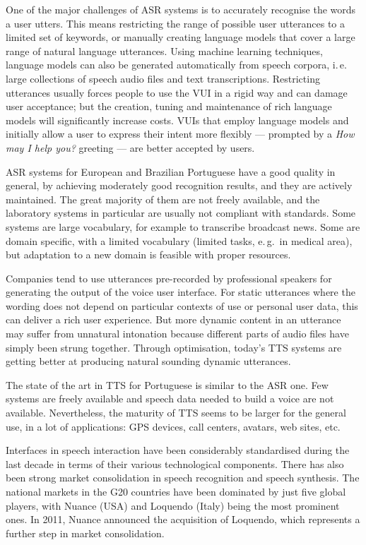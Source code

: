 \begin{multicols}{2}
One of the major challenges of ASR systems is to accurately recognise the words a user utters. This means restricting the range of possible user utterances to a limited set of keywords, or manually creating language models that cover a large range of natural language utterances. Using machine learning techniques, language models can also be generated automatically from speech corpora, i.\,e. large collections of speech audio files and text transcriptions. Restricting utterances usually forces people to use the VUI in a rigid way and can damage user acceptance; but the creation, tuning and maintenance of rich language models will significantly increase costs. VUIs that employ language models and initially allow a user to express their intent more flexibly — prompted by a \textit{How may I help you?} greeting —  are better accepted by users.

ASR systems for European and Brazilian Portuguese have a good quality in general, by achieving moderately good recognition results, and they are actively maintained. The great majority of them are not freely available, and the laboratory systems in particular are usually not compliant with standards. Some systems are large vocabulary, for example to transcribe broadcast news. Some are domain specific, with a limited vocabulary (limited tasks, e.\,g.~in medical area), but adaptation to a new domain is feasible with proper resources.

Companies tend to use utterances pre-recorded by professional speakers for generating the output of the voice user interface. For static utterances where the wording does not depend on particular contexts of use or personal user data, this can deliver a rich user experience. But more dynamic content in an utterance may suffer from unnatural intonation because different parts of audio files have simply been strung together. Through optimisation, today’s TTS systems are getting better at producing natural sounding dynamic utterances.

The state of the art in TTS for Portuguese is similar to the ASR one. Few systems are freely available and speech data needed to build a voice are not available. Nevertheless, the maturity of TTS seems to be larger for the general use, in a lot of applications: GPS devices, call centers, avatars, web sites, etc.

Interfaces in speech interaction have been considerably standardised during the last decade in terms of their various technological components. There has also been strong market consolidation in speech recognition and speech synthesis. The national markets in the G20 countries have been dominated by just five global players, with Nuance (USA) and Loquendo (Italy) being the most prominent ones. In 2011, Nuance announced the acquisition of Loquendo, which represents a further step in market consolidation.


\end{multicols}
